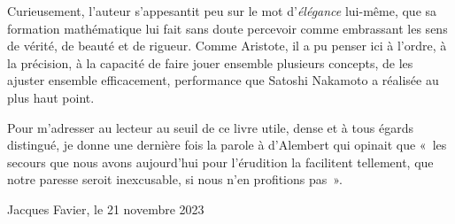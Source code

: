 Curieusement, l'auteur s'appesantit peu sur le mot d'\emph{élégance} lui-même, que sa formation mathématique lui fait sans doute percevoir comme embrassant les sens de vérité, de beauté et de rigueur. Comme Aristote, il a pu penser ici à l'ordre, à la précision, à la capacité de faire jouer ensemble plusieurs concepts, de les ajuster ensemble efficacement, performance que Satoshi Nakamoto a réalisée au plus haut point.

Pour m'adresser au lecteur au seuil de ce livre utile, dense et à tous égards distingué, je donne une dernière fois la parole à d'Alembert qui opinait que «~les secours que nous avons aujourd'hui pour l'érudition la facilitent tellement, que notre paresse seroit inexcusable, si nous n'en profitions pas~».

\begin{flushright}Jacques Favier, le 21 novembre 2023\end{flushright}
